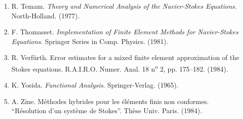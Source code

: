 \begin{enumerate}
\item R. Temam. \textit{Theory and Numerical Analysis of the Navier-Stokes Equations}. North-Holland. (1977).
\item F. Thomasset. \textit{Implementation of Finite Element Methods for Navier-Stokes Equations}. Springer Series in Comp. Physics. (1981).
\item R. Verfürth. Error estimates for a mixed finite element approximation of the Stokes equations. R.A.I.R.O. Numer. Anal. 18 n\textsuperscript{o} 2, pp. 175--182. (1984).
\item K. Yosida. \textit{Functional Analysis}. Springer-Verlag. (1965).
\item A. Zine. Méthodes hybrides pour les éléments finis non conformes. ``Résolution d'un système de Stokes''. Thèse Univ. Paris. (1984).
\end{enumerate}
\fussy
